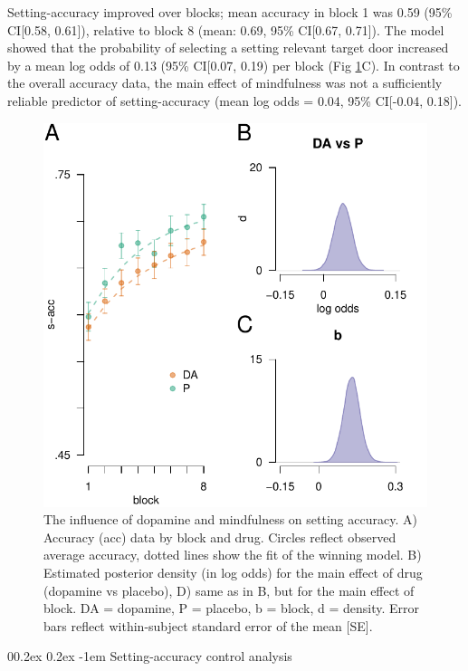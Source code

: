 \documentclass[
  man]{apa6}
\makeatletter
\let\oldparagraph\paragraph
\renewcommand{\paragraph}[1]{\oldparagraph{#1}\mbox{}}
\renewcommand{\paragraph}{\@startsection{paragraph}{4}{\parindent}%
  {0\baselineskip \@plus 0.2ex \@minus 0.2ex}%
  {-1em}%
  {\normalfont\normalsize\bfseries\itshape\typesectitle}}
\makeatother
\begin{document}
Setting-accuracy improved over blocks; mean accuracy in block 1 was 0.59 (95\% CI{[}0.58, 0.61{]}), relative to block 8 (mean: 0.69, 95\% CI{[}0.67, 0.71{]}). The model showed that the probability of selecting a setting relevant target door increased by a mean log odds of 0.13 (95\% CI{[}0.07, 0.19) per block (Fig \ref{fig:caccfig}C). In contrast to the overall accuracy data, the main effect of mindfulness was not a sufficiently reliable predictor of setting-accuracy (mean log odds = 0.04, 95\% CI{[}-0.04, 0.18{]}).

\begin{figure}

{\centering \includegraphics[width=0.7\linewidth]{../../images/cacc_fig} 

}

\caption{The influence of dopamine and mindfulness on setting accuracy. A) Accuracy (acc) data by block and drug. Circles reflect observed average accuracy, dotted lines show the fit of the winning model. B) Estimated posterior density (in log odds) for the main effect of drug (dopamine vs placebo), D) same as in B, but for the main effect of block. DA = dopamine, P = placebo, b = block, d = density. Error bars reflect within-subject standard error of the mean [SE].}\label{fig:caccfig}
\end{figure}

\hypertarget{setting-accuracy-control-analysis}{%
\paragraph{Setting-accuracy control analysis}\label{setting-accuracy-control-analysis}}
\end{document}
